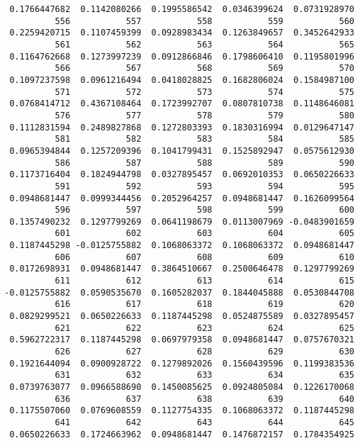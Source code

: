 \documentclass[
  letterpaper,
  DIV=11,
  numbers=noendperiod]{scrreprt}
\begin{document}
\begin{verbatim}
 0.1766447682  0.1142080266  0.1995586542  0.0346399624  0.0731928970 
          556           557           558           559           560 
 0.2259420715  0.1107459399  0.0928983434  0.1263849657  0.3452642933 
          561           562           563           564           565 
 0.1164762668  0.1273997239  0.0912866846  0.1798606410  0.1195801996 
          566           567           568           569           570 
 0.1097237598  0.0961216494  0.0418028825  0.1682806024  0.1584987100 
          571           572           573           574           575 
 0.0768414712  0.4367108464  0.1723992707  0.0807810738  0.1148646081 
          576           577           578           579           580 
 0.1112831594  0.2489827868  0.1272803393  0.1830316994  0.0129647147 
          581           582           583           584           585 
 0.0965394844  0.1257209396  0.1041799431  0.1525892947  0.0575612930 
          586           587           588           589           590 
 0.1173716404  0.1824944798  0.0327895457  0.0692010353  0.0650226633 
          591           592           593           594           595 
 0.0948681447  0.0999344456  0.2052964257  0.0948681447  0.1626099564 
          596           597           598           599           600 
 0.1357490232  0.1297799269  0.0641198679  0.0113007969 -0.0483901659 
          601           602           603           604           605 
 0.1187445298 -0.0125755882  0.1068063372  0.1068063372  0.0948681447 
          606           607           608           609           610 
 0.0172698931  0.0948681447  0.3864510667  0.2500646478  0.1297799269 
          611           612           613           614           615 
-0.0125755882  0.0590535670  0.1605282037  0.1844045888  0.0530844708 
          616           617           618           619           620 
 0.0829299521  0.0650226633  0.1187445298  0.0524875589  0.0327895457 
          621           622           623           624           625 
 0.5962722317  0.1187445298  0.0697979358  0.0948681447  0.0757670321 
          626           627           628           629           630 
 0.1921644094  0.0900928722  0.1279892026  0.1560439596  0.1199383536 
          631           632           633           634           635 
 0.0739763077  0.0966588690  0.1450085625  0.0924805084  0.1226170068 
          636           637           638           639           640 
 0.1175507060  0.0769608559  0.1127754335  0.1068063372  0.1187445298 
          641           642           643           644           645 
 0.0650226633  0.1724663962  0.0948681447  0.1476872157  0.1784354925 

\end{verbatim}
\end{document}
